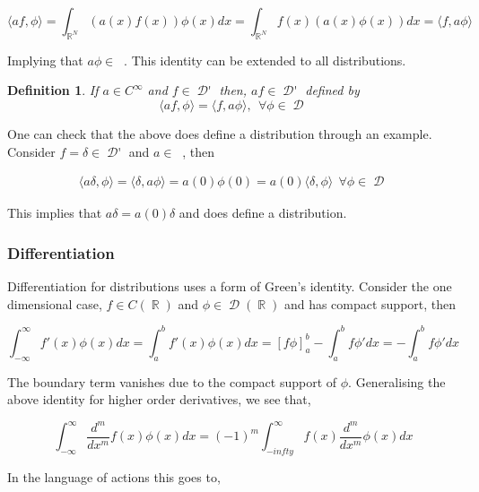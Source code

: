 \documentclass[12pt, a4]{article}
\newtheorem{definition}{Definition}[section]
\DeclareMathOperator\reals{\mathbb{R}}
\DeclareMathOperator\tfspace{C_0^\infty}
\DeclareMathOperator\tfspaceD{\mathcal{D}}
\DeclareMathOperator\dist{\mathcal{D'}}
\begin{document}
\begin{equation}
    \langle af, \phi\rangle = \int_{\reals^N}(a(x)f(x))\phi(x)dx = \int_{\reals^N}f(x) (a(x)\phi(x))dx = \langle f, a\phi \rangle
\end{equation}

Implying that $a\phi \in \tfspace$. This identity can be extended to all distributions.

\begin{definition}
    If $a \in C^\infty$ and $f \in \dist$ then, $af \in \dist$ defined by \[
        \langle af, \phi \rangle = \langle f, a\phi \rangle, \>\> \forall \phi \in \tfspaceD\]
\end{definition}

One can check that the above does define a distribution through an example. Consider $f = \delta \in \dist$ and $a \in \tfspace$, then

\begin{eqnarray}
    \langle a\delta, \phi \rangle = \langle \delta, a \phi \rangle = a(0)\phi(0) = a(0) \langle \delta, \phi \rangle \> \> \forall \phi \in \tfspaceD
\end{eqnarray}

This implies that $a\delta = a(0) \delta$ and does define a distribution.

\subsubsection{Differentiation}

Differentiation for distributions uses a form of Green's identity. Consider the one dimensional case, $f \in C(\reals)$ and $\phi \in \tfspaceD(\reals)$ and has compact support, then

\begin{equation}
    \int_{-\infty}^{\infty} f'(x) \phi(x) dx = \int_a^b f'(x)\phi(x)dx = \left [ f \phi \right ]_a^b - \int_a^b f\phi' dx = -\int_a^b f\phi' dx
\end{equation}

The boundary term vanishes due to the compact support of $\phi$. Generalising the above identity for higher order derivatives, we see that,

\begin{equation}
    \int_{-\infty}^{\infty} \frac{d^m}{dx^m} f(x) \phi(x) dx = (-1)^m \int_{-infty}^{\infty} f(x) \frac{d^m}{dx^m}\phi(x) dx
\end{equation}

In the language of actions this goes to,
\end{document}
